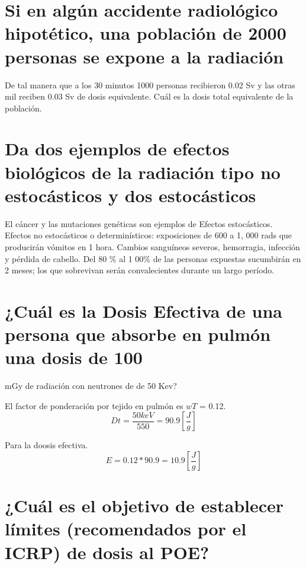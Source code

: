 \documentclass[]{article}
\begin{document}
\section{Si en algún accidente radiológico hipotético, una población de 2000 personas se expone a la radiación}
De tal manera que a los 30 minutos 1000 personas recibieron 0.02 Sv y las otras mil reciben 0.03 Sv de dosis
equivalente. Cuál es la dosis total equivalente de la población.


\section{Da dos ejemplos de efectos biológicos de la radiación tipo no estocásticos y dos estocásticos}

El cáncer y las mutaciones genéticas son ejemplos de Efectos estocásticos.\\

Efectos no estocásticos o determinísticos: exposiciones de 600 a 1, 000 rads que producirán vómitos en 1 hora. Cambios sanguíneos severos, hemorragia, infección y pérdida de cabello. Del 80 $\%$ al 1 00$\%$ de las personas expuestas sucumbirán en 2 meses; los que sobrevivan serán convalecientes durante un largo período.                                                                                                                                                                                                                                   

\section{¿Cuál es la Dosis Efectiva de una persona que absorbe en pulmón una dosis de 100}

mGy de radiación con neutrones de de 50 Kev?

El factor de ponderación por tejido en pulmón es $wT$ = 0.12.\\
\begin{equation}
  Dt=\frac{50 ke V}{550}=90.9 [\frac{J}{g}] 
\end{equation}

Para la doosis efectiva.\\

\begin{equation}
E=0.12*90.9=10.9 [\frac{J}{g}]
\end{equation}

\section{¿Cuál es el objetivo de establecer límites (recomendados por el ICRP) de dosis al POE?}
\end{document}
